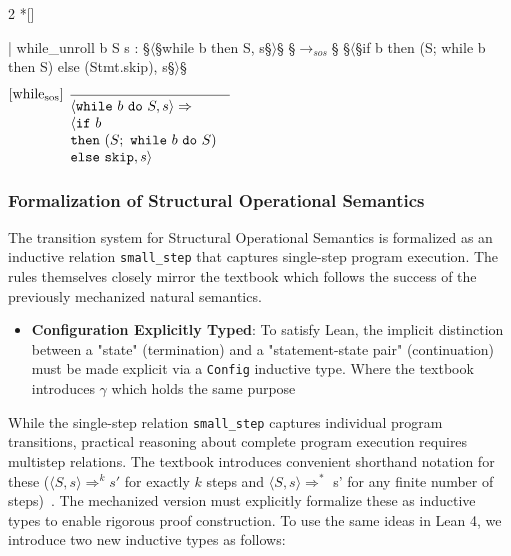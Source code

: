 \begin{paracol}{2}
    \switchcolumn[1]*[]
    \begin{leftcolumn}
        \begin{Lean_Code}
  | while_unroll {b S s} :
    §\(\langle\)§while b then S, s§\(\rangle\)§ §\(\to_{sos}\)§
      §\(\langle\)§if b
      then (S; while b then S)
      else (Stmt.skip), s§\(\rangle\)§
    \end{Lean_Code}
\end{leftcolumn}
\begin{rightcolumn}
\vspace{1.1em}
    \(
\begin{prooftree}
  \hypo{}
  \infer[
      left label={[while$_{\text{sos}}$]}
      ]1{
        \parbox{4cm}{$
            \langle \mathtt{while}\ b\ \mathtt{do}\ S, s \rangle \Rightarrow \\
            \langle \mathtt{if}\ b\ \\
            \mathtt{then}\ (S;\ \mathtt{while}\ b\ \mathtt{do}\ S)\ \\
            \mathtt{else}\ \mathtt{skip}, s \rangle
        $}
    }
\end{prooftree}
    \)
\end{rightcolumn}
\end{paracol}
\vspace{1em}

\subsubsection*{Formalization of Structural Operational Semantics}

The transition system for Structural Operational Semantics is formalized
as an inductive relation \texttt{small\_step} that captures single-step
program execution.
The rules themselves closely mirror the textbook which follows the
success of the previously mechanized natural semantics.
\begin{itemize}
    \item \textbf{Configuration Explicitly Typed}:
    To satisfy Lean, the implicit distinction between a "state"
    (termination) and a "statement-state pair" (continuation) must be made
    explicit via a \texttt{Config} inductive type.
    Where the textbook introduces \(\gamma\) which holds the same purpose
\end{itemize}

While the single-step relation \texttt{small\_step} captures individual
program transitions, practical reasoning about complete program execution
requires multistep relations. The textbook introduces convenient shorthand
notation for these ($\langle S, s\rangle \Rightarrow^{k} s'$ for exactly
$k$ steps and $\langle S, s\rangle \Rightarrow^{*}$ s' for any finite number
of steps)~\citep[p.~34, 35]{nielson_semantics_2007}. The mechanized version must explicitly formalize these as inductive
types to enable rigorous proof construction. To use the same ideas in Lean 4,
we introduce two new inductive types as follows:

